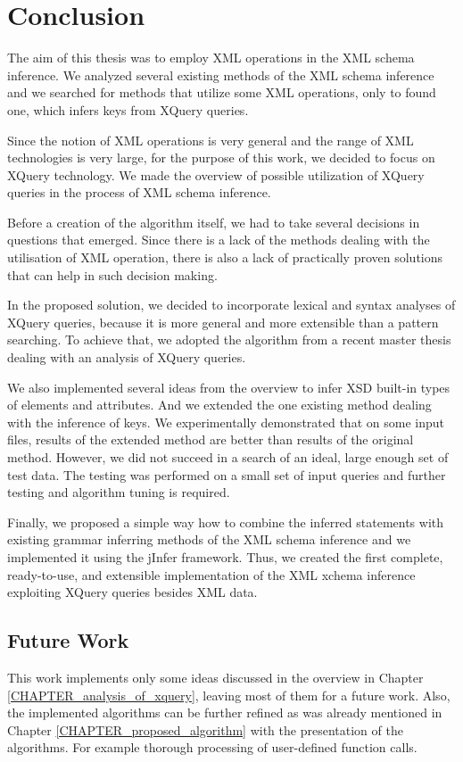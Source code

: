 \chapter{Conclusion}
The aim of this thesis was to employ XML operations in the XML schema inference. We analyzed several existing methods of the XML schema inference and we searched for methods that utilize some XML operations, only to found one, which infers keys from XQuery queries.

Since the notion of XML operations is very general and the range of XML technologies is very large, for the purpose of this work, we decided to focus on XQuery technology. We made the overview of possible utilization of XQuery queries in the process of XML schema inference.

Before a creation of the algorithm itself, we had to take several decisions in questions that emerged. Since there is a lack of the methods dealing with the utilisation of XML operation, there is also a lack of practically proven solutions that can help in such decision making.

In the proposed solution, we decided to incorporate lexical and syntax analyses of XQuery queries, because it is more general and more extensible than a pattern searching. To achieve that, we adopted the algorithm from a recent master thesis dealing with an analysis of XQuery queries.

We also implemented several ideas from the overview to infer XSD built-in types of elements and attributes. And we extended the one existing method dealing with the inference of keys. We experimentally demonstrated that on some input files, results of the extended method are better than results of the original method. However, we did not succeed in a search of an ideal, large enough set of test data. The testing was performed on a small set of input queries and further testing and algorithm tuning is required.

Finally, we proposed a simple way how to combine the inferred statements with existing grammar inferring methods of the XML schema inference and we implemented it using the jInfer framework. Thus, we created the first complete, ready-to-use, and extensible implementation of the XML xchema inference exploiting XQuery queries besides XML data.


\section{Future Work}
This work implements only some ideas discussed in the overview in Chapter \ref{CHAPTER_analysis_of_xquery}, leaving most of them for a future work. Also, the implemented algorithms can be further refined as was already mentioned in Chapter \ref{CHAPTER_proposed_algorithm} with the presentation of the algorithms. For example thorough processing of user-defined function calls.

